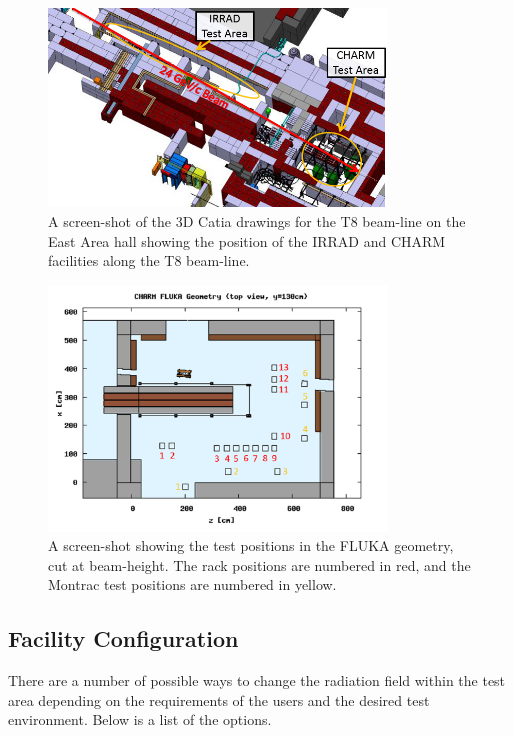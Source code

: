 \begin{figure}[ht!]
	\centering
	\includegraphics[width=0.8\textwidth]{./images/irrad2}
	\caption{A screen-shot of the 3D Catia drawings for the T8 beam-line on the East Area hall showing the position of the IRRAD and CHARM facilities along the T8 beam-line.}
	\label{fig:t8_screenshot}
\end{figure}

\begin{figure}[!ht]
	\centering
	\includegraphics[width=0.8\textwidth]{./images/test_pos_new_ann}
	\caption{A screen-shot showing the test positions in the FLUKA geometry, cut at beam-height. The rack positions are numbered in red, and the Montrac test positions are numbered in yellow.}
	\label{fig:fluka_test_positions}
\end{figure}

\clearpage
\subsection{Facility Configuration}

There are a number of possible ways to change the radiation field within the test area depending on the requirements of the users and the desired test environment. Below is a list of the options.

